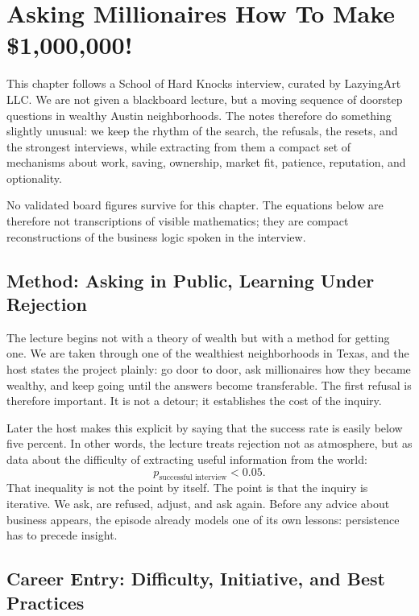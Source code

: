 \chapter{Asking Millionaires How To Make \$1{,}000{,}000!}

This chapter follows a School of Hard Knocks interview, curated by LazyingArt LLC. We are not given a blackboard lecture, but a moving sequence of doorstep questions in wealthy Austin neighborhoods. The notes therefore do something slightly unusual: we keep the rhythm of the search, the refusals, the resets, and the strongest interviews, while extracting from them a compact set of mechanisms about work, saving, ownership, market fit, patience, reputation, and optionality.

\begin{remark}
No validated board figures survive for this chapter. The equations below are therefore not transcriptions of visible mathematics; they are compact reconstructions of the business logic spoken in the interview.
\end{remark}

\section{Method: Asking in Public, Learning Under Rejection}

The lecture begins not with a theory of wealth but with a method for getting one. We are taken through one of the wealthiest neighborhoods in Texas, and the host states the project plainly: go door to door, ask millionaires how they became wealthy, and keep going until the answers become transferable. The first refusal is therefore important. It is not a detour; it establishes the cost of the inquiry.

Later the host makes this explicit by saying that the success rate is easily below five percent. In other words, the lecture treats rejection not as atmosphere, but as data about the difficulty of extracting useful information from the world:
\begin{equation}
p_{\text{successful interview}} < 0.05.
\end{equation}
That inequality is not the point by itself. The point is that the inquiry is iterative. We ask, are refused, adjust, and ask again. Before any advice about business appears, the episode already models one of its own lessons: persistence has to precede insight.

\section{Career Entry: Difficulty, Initiative, and Best Practices}

